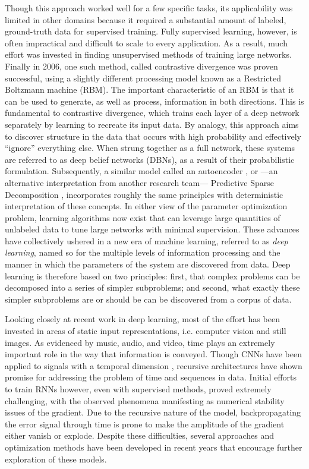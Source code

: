 Though this approach worked well for a few specific tasks, its applicability was limited in other domains because it required a substantial amount of labeled, ground-truth data for supervised training.
Fully supervised learning, however, is often impractical and difficult to scale to every application.
As a result, much effort was invested in finding unsupervised methods of training large networks.
Finally in 2006, one such method, called contrastive divergence was proven successful, using a slightly different processing model known as a Restricted Boltzmann machine (RBM).
The important characteristic of an RBM is that it can be used to generate, as well as process, information in both directions.
This is fundamental to contrastive divergence, which trains each layer of a deep network separately by learning to recreate its input data.
By analogy, this approach aims to discover structure in the data that occurs with high probability and effectively ``ignore'' everything else.
When strung together as a full network, these systems are referred to as deep belief networks (DBNs), as a result of their probabilistic formulation.
Subsequently, a similar model called an autoencoder \cite{Vincent2010}, or ---an alternative interpretation from another research team--- Predictive Sparse Decomposition \cite{Ranzato2007}, incorporates roughly the same principles with deterministic interpretation of these concepts.
In either view of the parameter optimization problem, learning algorithms now exist that can leverage large quantities of unlabeled data to tune large networks with minimal supervision.
These advances have collectively ushered in a new era of machine learning, referred to as \emph{deep learning}, named so for the multiple levels of information processing and the manner in which the parameters of the system are discovered from data.
Deep learning is therefore based on two principles: first, that complex problems can be decomposed into a series of simpler subproblems; and second, what exactly these simpler subproblems are or should be can be discovered from a corpus of data.

Looking closely at recent work in deep learning, most of the effort has been invested in areas of static input representations, i.e. computer vision and still images.
As evidenced by music, audio, and video, time plays an extremely important role in the way that information is conveyed.
Though CNNs have been applied to signals with a temporal dimension \cite{LeCun1994}, recursive architectures have shown promise for addressing the problem of time and sequences in data.
Initial efforts to train RNNs however, even with supervised methods, proved extremely challenging, with the observed phenomena manifesting as numerical stability issues of the gradient.
Due to the recursive nature of the model, backpropagating the error signal through time is prone to make the amplitude of the gradient either vanish or explode.
Despite these difficulties, several approaches and optimization methods have been developed in recent years that encourage further exploration of these models.

